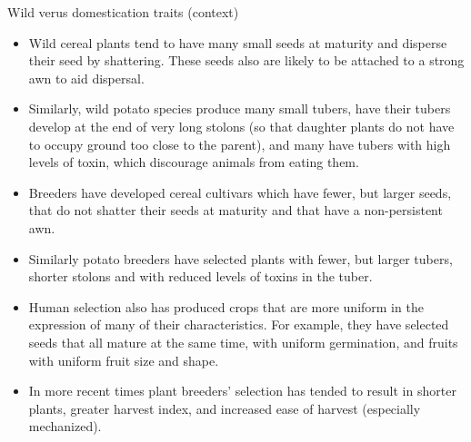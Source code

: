 \documentclass[ignorenonframetext,aspectratio=169]{beamer}
\begin{document}
\begin{frame}{Wild verus domestication traits (context)}
\protect\hypertarget{wild-verus-domestication-traits-context}{}

\begin{itemize}
\item
  Wild cereal plants tend to have many small seeds at maturity and
  disperse their seed by shattering. These seeds also are likely to be
  attached to a strong awn to aid dispersal.
\item
  Similarly, wild potato species produce many small tubers, have their
  tubers develop at the end of very long stolons (so that daughter
  plants do not have to occupy ground too close to the parent), and many
  have tubers with high levels of toxin, which discourage animals from
  eating them.
\item
  Breeders have developed cereal cultivars which have fewer, but larger
  seeds, that do not shatter their seeds at maturity and that have a
  non-persistent awn.
\end{itemize}

\end{frame}

\begin{frame}{}
\protect\hypertarget{section-5}{}

\begin{itemize}
\item
  Similarly potato breeders have selected plants with fewer, but larger
  tubers, shorter stolons and with reduced levels of toxins in the
  tuber.
\item
  Human selection also has produced crops that are more uniform in the
  expression of many of their characteristics. For example, they have
  selected seeds that all mature at the same time, with uniform
  germination, and fruits with uniform fruit size and shape.
\item
  In more recent times plant breeders' selection has tended to result in
  shorter plants, greater harvest index, and increased ease of harvest
  (especially mechanized).
\end{itemize}

\end{frame}
\end{document}
